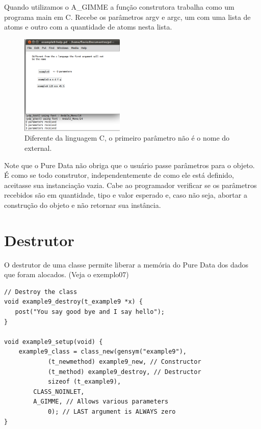 \documentclass[10pt,a4paper]{report}
\begin{document}
Quando utilizamos o A\_GIMME a função construtora trabalha como um programa main em C. Recebe os parâmetros argv e argc, um com uma lista de atoms e outro com a quantidade de atoms nesta lista.

\begin{figure}[h!]
	\centering
	\includegraphics[height=180]{./images/example9}
	\caption{Diferente da linguagem C, o primeiro parâmetro não é o nome do external.}
\end{figure}

Note que o Pure Data não obriga que o usuário passe parâmetros para o objeto. É como se todo construtor, independentemente de como ele está definido, aceitasse sua instanciação vazia. Cabe ao programador verificar se os parâmetros recebidos são em quantidade, tipo e valor esperado e, caso não seja, abortar a construção do objeto e não retornar sua instância.

\section{Destrutor}
O destrutor de uma classe permite liberar a memória do Pure Data dos dados que foram alocados. (Veja o exemplo07)
\begin{lstlisting}
// Destroy the class
void example9_destroy(t_example9 *x) {
   post("You say good bye and I say hello");
}

void example9_setup(void) {
    example9_class = class_new(gensym("example9"),
            (t_newmethod) example9_new, // Constructor
            (t_method) example9_destroy, // Destructor
            sizeof (t_example9),
	    CLASS_NOINLET,
	    A_GIMME, // Allows various parameters
            0); // LAST argument is ALWAYS zero
}

\end{lstlisting}
\end{document}

